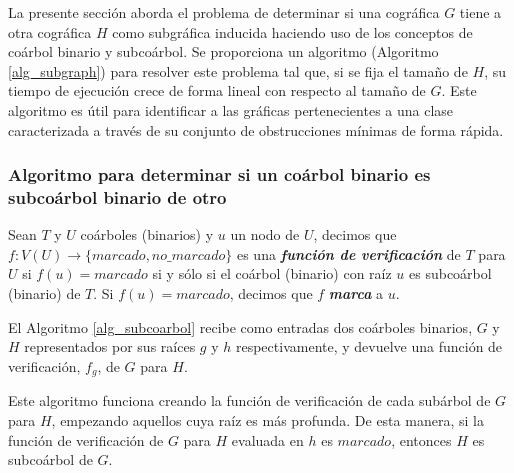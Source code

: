 La presente sección aborda el problema de determinar si una cográfica $G$ tiene
a otra cográfica $H$ como subgráfica inducida haciendo uso de los conceptos de
coárbol binario y subcoárbol. Se proporciona un algoritmo (Algoritmo
\ref{alg_subgraph}) para resolver este problema tal que, si se fija el tamaño de
$H$, su tiempo de ejecución crece de forma lineal con respecto al tamaño de $G$.
Este algoritmo es útil para identificar a las gráficas pertenecientes a una clase 
caracterizada a través de su conjunto de obstrucciones mínimas de forma rápida.

\subsubsection{Algoritmo para determinar si un coárbol binario es subcoárbol binario de otro}

\begin{definition}
    Sean $T$ y $U$ coárboles (binarios) y $u$ un nodo de $U$, decimos que
    $f:V(U)\rightarrow\{marcado, no\_marcado\}$ es una \textbf{\emph{función de
    verificación}} de $T$ para $U$ si $f(u) = marcado$ si y sólo si el coárbol
    (binario) con raíz $u$ es subcoárbol (binario) de $T$. Si $f(u) = marcado$,
    decimos que $f$ \textbf{\emph{marca}} a $u$.
\end{definition}

El Algoritmo \ref{alg_subcoarbol} recibe como entradas dos coárboles binarios,
$G$ y $H$ representados por sus raíces $g$ y $h$ respectivamente, y devuelve una
función de verificación, $f_g$, de $G$ para $H$.

Este algoritmo funciona creando la función de verificación de cada subárbol de $G$ para $H$, empezando aquellos cuya raíz es más profunda. De esta manera, si la función de verificación de $G$ para $H$ evaluada en $h$ es $marcado$, entonces  $H$ es subcoárbol de $G$.

